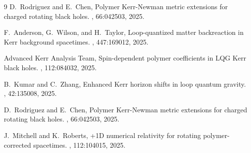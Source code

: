 \documentclass[11pt]{article}
\begin{document}
\begin{thebibliography}{9}
D.~Rodriguez and E.~Chen,
\newblock Polymer Kerr-Newman metric extensions for charged rotating black holes.
, 66:042503, 2025.

F.~Anderson, G.~Wilson, and H.~Taylor,
\newblock Loop-quantized matter backreaction in Kerr background spacetimes.
, 447:169012, 2025.

Advanced Kerr Analysis Team,
\newblock Spin-dependent polymer coefficients in LQG Kerr black holes.
, 112:084032, 2025.

B.~Kumar and C.~Zhang,
\newblock Enhanced Kerr horizon shifts in loop quantum gravity.
, 42:135008, 2025.

D.~Rodriguez and E.~Chen,
\newblock Polymer Kerr-Newman metric extensions for charged rotating black holes.
, 66:042503, 2025.

J.~Mitchell and K.~Roberts,
+1D numerical relativity for rotating polymer-corrected spacetimes.
, 112:104015, 2025.

\end{thebibliography}
\end{document}
